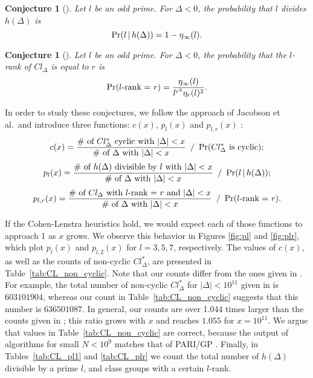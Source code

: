 \documentclass{mcom-l}
\newtheorem{conj}[thm]{Conjecture}
\theoremstyle{definition}
\begin{document}
\begin{conj}[{\cite[C2]{cohen2}}]  
Let $l$ be an odd prime. For $\Delta < 0$, the probability that $l$ divides $h(\Delta)$ is
\begin{equation} \label{eq:l_divides_h}
\textnormal{Pr($l\,|\,h(\Delta)$)} =1 - \eta_\infty(l).
\end{equation}
\end{conj}

\begin{conj}[{\cite[C5]{cohen2}}]
Let $l$ be an odd prime. For $\Delta < 0$, the probability that the
$l$-rank of $Cl_\Delta$ is equal to $r$ is
\begin{equation} \label{eq:p-rank_is_r}
\textnormal{Pr($l$-rank = $r$)} = \frac{\eta_\infty(l)}{l^{r^2}\eta_r(l)^2}.
\end{equation}
\end{conj}

In order to study these conjectures, we follow the approach of
Jacobson et al.\ and introduce three functions: $c(x)$, $p_l(x)$ and
$p_{l,r}(x)$ \cite[Section 3.2]{jacobson}:
$$
c(x) = \frac{\textnormal{\# of $Cl_\Delta^*$ cyclic with $|\Delta| < x$}}{\textnormal{\# of $\Delta$ with $|\Delta| < x$}}\,\,\,/\,\,\,\textnormal{Pr($Cl_\Delta^*$ is cyclic)};
$$
$$
p_l(x) = \frac{\textnormal{\# of $h(\Delta)$ divisible by $l$ with $|\Delta| < x$}}{\textnormal{\# of $\Delta$ with $|\Delta| < x$}}\,\,\,/\,\,\,\textnormal{Pr($l\,|\,h(\Delta)$)};
$$
$$
p_{l,r}(x) = \frac{\textnormal{\# of $Cl_\Delta$ with $l$-rank = $r$ and $|\Delta| < x$}}{\textnormal{\# of $\Delta$ with $|\Delta| < x$}}\,\,\,/\,\,\,\textnormal{Pr($l$-rank = $r$)}.
$$

If the Cohen-Lenstra heuristics hold, we would expect each of those
functions to approach 1 as $x$ grows. We observe this behavior in
Figures \ref{fig:pl} and \ref{fig:plr}, which plot $p_l(x)$ and
$p_{l,2}(x)$ for $l = 3, 5, 7$, respectively. The values of $c(x)$, as
well as the counts of non-cyclic $Cl_\Delta^*$, are presented in
Table~\ref{tab:CL_non_cyclic}. Note that our counts differ from the
ones given in \cite[Table~3]{jacobson}. For example, the total number
of non-cyclic $Cl_\Delta^*$ for $|\Delta| < 10^{11}$ given in
\cite[Table~3]{jacobson} is $603101904$, whereas our count in
Table~\ref{tab:CL_non_cyclic} suggests that this number is
$636501087$. In general, our counts are over 1.044 times larger than
the counts given in \cite[Table~3]{jacobson}; this ratio grows with
$x$ and reaches $1.055$ for $x = 10^{11}$. We argue that values in
Table~\ref{tab:CL_non_cyclic} are correct, because the output of
algorithms for small $N < 10^{9}$ matches that of PARI/GP
\cite{pari}. Finally, in Tables~\ref{tab:CL_pl1} and \ref{tab:CL_plr}
we count the total number of $h(\Delta)$ divisible by a prime $l$, and
class groups with a certain $l$-rank.
\end{document}
